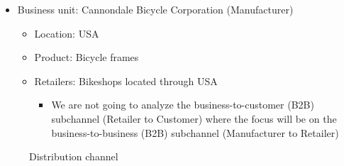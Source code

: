 \documentclass[
  ignorenonframetext,
]{beamer}
\providecommand{\tightlist}{%
  \setlength{\itemsep}{0pt}\setlength{\parskip}{0pt}}\usepackage{longtable,booktabs,array}
\begin{document}
\begin{frame}{}
\label{section-3}
\begin{itemize}
\item
  Business unit: Cannondale Bicycle Corporation (Manufacturer)

  \begin{itemize}
  \item
    Location: USA
  \item
    Product: Bicycle frames
  \item
    Retailers: Bikeshops located through USA

    \begin{itemize}
    \tightlist
    \item
      We are not going to analyze the business-to-customer (B2B)
      subchannel (Retailer to Customer) where the focus will be on the
      business-to-business (B2B) subchannel (Manufacturer to Retailer)
    \end{itemize}
  \end{itemize}
\end{itemize}

\begin{figure}


\caption{\label{fig-distribution-channel}Distribution channel}

\end{figure}%
\end{frame}
\end{document}
